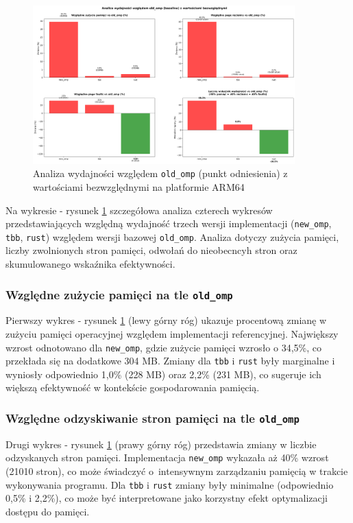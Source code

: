 \begin{figure}[H]
    \centering
    \includegraphics[width=0.9\textwidth]{analiza/images/parallel/cg/arm/chart_05_performance_ratios.png}
    \caption{Analiza wydajności względem \texttt{old\_omp} (punkt odniesienia) z wartościami bezwzględnymi na platformie ARM64}
    \label{cg_analiza_wzgledem_old_omp}
\end{figure}
Na wykresie - rysunek \ref{cg_analiza_wzgledem_old_omp} szczegółowa analiza czterech wykresów przedstawiających względną wydajność trzech wersji implementacji (\texttt{new\_omp}, \texttt{tbb}, \texttt{rust}) względem wersji bazowej \texttt{old\_omp}. Analiza dotyczy zużycia pamięci, liczby zwolnionych stron pamięci, odwołań do nieobecncyh stron oraz skumulowanego wskaźnika efektywności.
\subsubsection{Względne zużycie pamięci na tle \texttt{old\_omp}}
Pierwszy wykres - rysunek \ref{cg_analiza_wzgledem_old_omp} (lewy górny róg) ukazuje procentową zmianę w zużyciu pamięci operacyjnej względem implementacji referencyjnej. Największy wzrost odnotowano dla \texttt{new\_omp}, gdzie zużycie pamięci wzrosło o 34,5\%, co przekłada się na dodatkowe 304 MB. Zmiany dla \texttt{tbb} i \texttt{rust} były marginalne i wyniosły odpowiednio 1,0\% (228 MB) oraz 2,2\% (231 MB), co sugeruje ich większą efektywność w kontekście gospodarowania pamięcią.

\subsubsection{Względne odzyskiwanie stron pamięci na tle \texttt{old\_omp}}
Drugi wykres - rysunek \ref{cg_analiza_wzgledem_old_omp} (prawy górny róg) przedstawia zmiany w liczbie odzyskanych stron pamięci. Implementacja \texttt{new\_omp} wykazała aż 40\% wzrost (21010 stron), co może świadczyć o~intensywnym zarządzaniu pamięcią w trakcie wykonywania programu. Dla \texttt{tbb} i \texttt{rust} zmiany były minimalne (odpowiednio 0,5\% i 2,2\%), co może być interpretowane jako korzystny efekt optymalizacji dostępu do pamięci.

